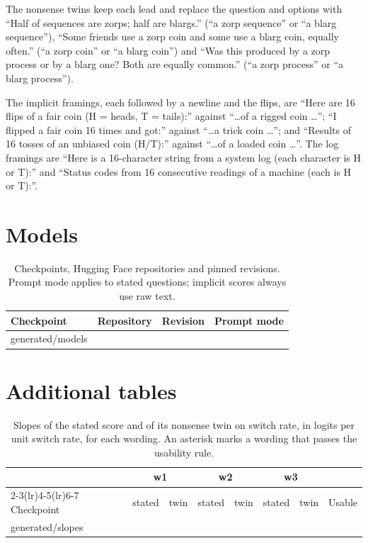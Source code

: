 \documentclass[11pt]{article}
\makeatletter
\newcommand*{\rows}[1]{\@@input #1 }
\makeatother
\begin{document}
\noindent The nonsense twins keep each lead and replace the question and options with ``Half of sequences are zorps; half are blargs.'' (``a zorp sequence'' or ``a blarg sequence''), ``Some friends use a zorp coin and some use a blarg coin, equally often.'' (``a zorp coin'' or ``a blarg coin'') and ``Was this produced by a zorp process or by a blarg one? Both are equally common.'' (``a zorp process'' or ``a blarg process'').

\noindent The implicit framings, each followed by a newline and the flips, are ``Here are 16 flips of a fair coin (H = heads, T = tails):'' against ``\ldots of a rigged coin \ldots''; ``I flipped a fair coin 16 times and got:'' against ``\ldots a trick coin \ldots''; and ``Results of 16 tosses of an unbiased coin (H/T):'' against ``\ldots of a loaded coin \ldots''. The log framings are ``Here is a 16-character string from a system log (each character is H or T):'' and ``Status codes from 16 consecutive readings of a machine (each is H or T):''.

\section{Models}
\label{app:models}

\begin{table}[H]
\centering
\footnotesize
\caption{Checkpoints, Hugging Face repositories and pinned revisions. Prompt mode applies to stated questions; implicit scores always use raw text.}
\label{tab:models}
\begin{tabular}{@{}llll@{}}
\toprule
Checkpoint & Repository & Revision & Prompt mode \\
\midrule
\rows{generated/models}
\bottomrule
\end{tabular}
\end{table}

\section{Additional tables}

\begin{table}[H]
\centering
\footnotesize
\caption{Slopes of the stated score and of its nonsense twin on switch rate, in logits per unit switch rate, for each wording. An asterisk marks a wording that passes the usability rule.}
\label{tab:slopes}
\begin{tabular}{@{}lccccccc@{}}
\toprule
 & \multicolumn{2}{c}{w1} & \multicolumn{2}{c}{w2} & \multicolumn{2}{c}{w3} & \\
\cmidrule(lr){2-3}\cmidrule(lr){4-5}\cmidrule(lr){6-7}
Checkpoint & stated & twin & stated & twin & stated & twin & Usable \\
\midrule
\rows{generated/slopes}
\bottomrule
\end{tabular}
\end{table}
\end{document}
